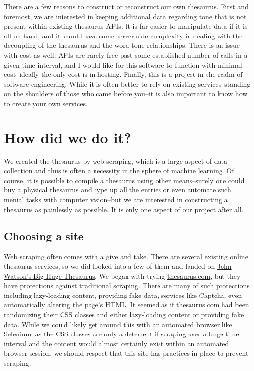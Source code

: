 \documentclass[11pt, twoside, reqno]{book}
\begin{document}
There are a few reasons to construct or reconstruct our own thesaurus. First and foremost, we are interested in keeping additional data regarding tone that is not present within existing thesaurus APIs. It is far easier to manipulate data if it is all on hand, and it should save some server-side complexity in dealing with the decoupling of the thesaurus and the word-tone relationships. There is an issue with cost as well: APIs are rarely free past some established number of calls in a given time interval, and I would like for this software to function with minimal cost--ideally the only cost is in hosting. Finally, this is a project in the realm of software engineering. While it is often better to rely on existing services--standing on the shoulders of those who came before you--it is also important to know how to create your own services.

\section{How did we do it?}

We created the thesaurus by web scraping, which is a large aspect of data-collection and thus is often a necessity in the sphere of machine learning. Of course, it is possible to compile a thesaurus using other means--surely one could buy a physical thesaurus and type up all the entries or even automate such menial tasks with computer vision--but we are interested in constructing a thesaurus as painlessly as possible. It is only one aspect of our project after all.

\subsection{Choosing a site}

Web scraping often comes with a give and take. There are several existing online thesaurus services, so we did looked into a few of them and landed on \href{https://words.bighugelabs.com}{John Watson's Big Huge Thesaurus}. We began with trying \href{https://www.thesaurus.com}{thesaurus.com}, but they have protections against traditional scraping. There are many of such protections including lazy-loading content, providing fake data, services like Captcha, even automatically altering the page's HTML. It seemed as if \href{https://www.thesaurus.com}{thesaurus.com} had been randomizing their CSS classes and either lazy-loading content or providing fake data. While we could likely get around this with an automated browser like \href{https://www.seleniumhq.org/}{Selenium}, as the CSS classes are only a deterrent if scraping over a large time interval and the content would almost certainly exist within an automated browser session, we should respect that this site has practices in place to prevent scraping.
\end{document}
